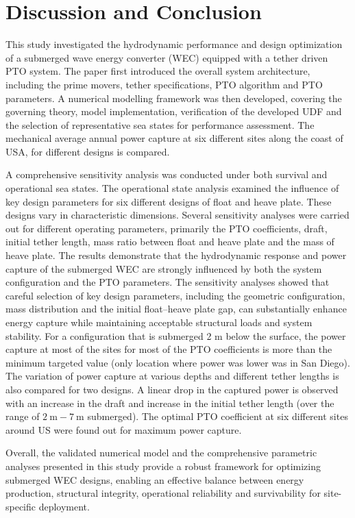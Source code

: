 \documentclass[10pt,journal,a4paper,twoside]{./IMEJ}
\begin{document}
\section{Discussion and Conclusion}
This study investigated the hydrodynamic performance and design optimization of a submerged wave energy converter (WEC) equipped with a tether driven PTO system. The paper first introduced the overall system architecture, including the prime movers, tether specifications, PTO algorithm and PTO parameters. A numerical modelling framework was then developed, covering the governing theory, model implementation, verification of the developed UDF and the selection of representative sea states for performance assessment. The mechanical average annual power capture at six different sites along the coast of USA, for different designs is compared.
\par
A comprehensive sensitivity analysis was conducted under both survival and operational sea states. The operational state analysis examined the influence of key design parameters for six different designs of float and heave plate. These designs vary in characteristic dimensions. Several sensitivity analyses were carried out for different operating parameters, primarily the PTO coefficients, draft, initial tether length, mass ratio between float and heave plate and the mass of heave plate. The results demonstrate that the hydrodynamic response and power capture of the submerged WEC are strongly influenced by both the system configuration and the PTO parameters. The sensitivity analyses showed that careful selection of key design parameters, including the geometric configuration, mass distribution and the initial float–heave plate gap, can substantially enhance energy capture while maintaining acceptable structural loads and system stability. For a configuration that is submerged 2 m below the surface, the power capture at most of the sites for most of the PTO coefficients is more than the minimum targeted value (only location where power was lower was in San Diego). The variation of power capture at various depths and different tether lengths is also compared for two designs. A linear drop in the captured power is observed with an increase in the draft and increase in the initial tether length (over the range of \(2~\mathrm{m}-7~\mathrm{m}\) submerged). The optimal PTO coefficient at six different sites around US were found out for maximum power capture.
\par
Overall, the validated numerical model and the comprehensive parametric analyses presented in this study provide a robust framework for optimizing submerged WEC designs, enabling an effective balance between energy production, structural integrity, operational reliability and survivability for site-specific deployment.
\end{document}
